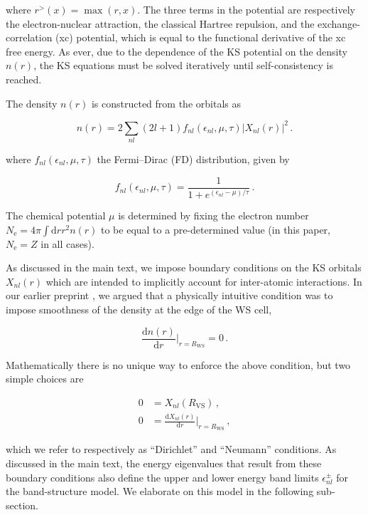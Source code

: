 \documentclass[preprint,aps]{revtex4-2}
\begin{document}
where \(r^>(x)=\max(r,x)\). The three terms in the potential are
respectively the electron-nuclear attraction, the classical Hartree
repulsion, and the exchange-correlation (xc) potential, which is equal
to the functional derivative of the xc free energy. As ever, due to the
dependence of the KS potential on the density \(n(r)\), the KS equations
must be solved iteratively until self-consistency is reached.

The density \(n(r)\) is constructed from the orbitals as

\begin{equation}
n(r) = 2\sum_{nl}(2l+1) f_{nl}(\epsilon_{nl},\mu,\tau) |X_{nl}(r)|^2\,.
\end{equation}

where \(f_{nl}(\epsilon_{nl},\mu,\tau)\) the Fermi--Dirac (FD)
distribution, given by

\begin{equation}
f_{nl}(\epsilon_{nl},\mu,\tau) = \frac{1}{1+e^{(\epsilon_{nl}-\mu)/\tau}}\,.
\end{equation}

The chemical potential \(\mu\) is determined by fixing the electron
number \(N_\textrm{e}=4\pi\int\textrm{d}r r^2 n(r)\) to be equal to a
pre-determined value (in this paper, \(N_\textrm{e}=Z\) in all cases).

As discussed in the main text, we impose boundary conditions on the KS
orbitals \(X_{nl}(r)\) which are intended to implicitly account for
inter-atomic interactions. In our earlier preprint
\cite{callow2021firstprinciples}, we argued that a physically intuitive
condition was to impose smoothness of the density at the edge of the WS
cell,

\begin{equation}
\frac{\textrm{d}n(r)}{\textrm{d}r}\Bigg|_{r=R_\textrm{WS}} =0\,.
\end{equation}

Mathematically there is no unique way to enforce the above condition,
but two simple choices are

\begin{align}
0&=X_{nl}(R_\textrm{VS})\,, \\
0&=\frac{\textrm{d}X_{nl}(r)}{\textrm{d}r}\Bigg|_{r=R_\textrm{WS}}\,,
\end{align}

which we refer to respectively as ``Dirichlet'' and ``Neumann''
conditions. As discussed in the main text, the energy eigenvalues that
result from these boundary conditions also define the upper and lower
energy band limits \(\epsilon^{\pm}_{nl}\) for the band-structure model.
We elaborate on this model in the following sub-section.
\end{document}
